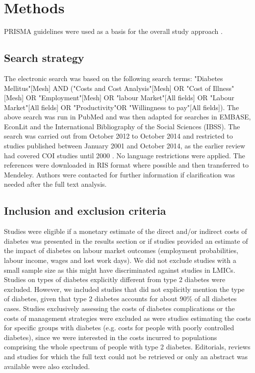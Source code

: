 \section{Methods}

\ac{PRISMA} guidelines were used as a basis for the overall study approach \parencite{Moher2009b}.
\subsection{Search strategy}
The electronic search was based on the following search terms: "Diabetes Mellitus"[Mesh] AND ("Costs and Cost Analysis"[Mesh] OR "Cost of Illness"[Mesh] OR "Employment"[Mesh] OR "labour Market"[All fields] OR "Labour Market"[All fields] OR "Productivity"OR "Willingness to pay"[All fields]). The above search was run in PubMed and was then adapted for searches in EMBASE, EconLit and the International Bibliography of the Social Sciences (IBSS). The search was carried out from October 2012 to October 2014 and restricted to studies published between January 2001 and October 2014, as the earlier review had covered \ac{COI} studies until 2000 \parencite{Ettaro2004}. No language restrictions were applied. The references were downloaded in RIS format where possible and then transferred to Mendeley. Authors were contacted for further information if clarification was needed after the full text analysis.

\subsection{Inclusion and exclusion criteria}
Studies were eligible if a monetary estimate of the direct and/or indirect costs of diabetes was presented in the results section or if studies provided an estimate of the impact of diabetes on labour market outcomes (employment probabilities, labour income, wages and lost work days). We did not exclude studies with a small sample size as this might have discriminated against studies in \acp{LMIC}. Studies on types of diabetes explicitly different from type 2 diabetes were excluded. However, we included studies that did not explicitly mention the type of diabetes, given that type 2 diabetes accounts for about 90\% of all diabetes cases. Studies exclusively assessing the costs of diabetes complications or the costs of management strategies were excluded as were studies estimating the costs for specific groups with diabetes (e.g. costs for people with poorly controlled diabetes), since we were interested in the costs incurred to populations comprising the whole spectrum of people with type 2 diabetes. Editorials, reviews and studies for which the full text could not be retrieved or only an abstract was available were also excluded.

